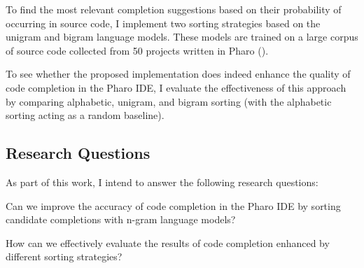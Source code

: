 To find the most relevant completion suggestions based on their probability of occurring in source code, I implement two sorting strategies based on the unigram and bigram language models. These models are trained on a large corpus of source code collected from 50 projects written in Pharo (\cite{Zait20a}).

To see whether the proposed implementation does indeed enhance the quality of code completion in the Pharo IDE, I evaluate the effectiveness of this approach by comparing alphabetic, unigram, and bigram sorting (with the alphabetic sorting acting as a random baseline).

\subsection{Research Questions}
As part of this work, I intend to answer the following research questions:
\begin{RQ}
    \item Can we improve the accuracy of code completion in the Pharo IDE by sorting candidate completions with n-gram language models?
    \item How can we effectively evaluate the results of code completion enhanced by different sorting strategies?
\end{RQ}

